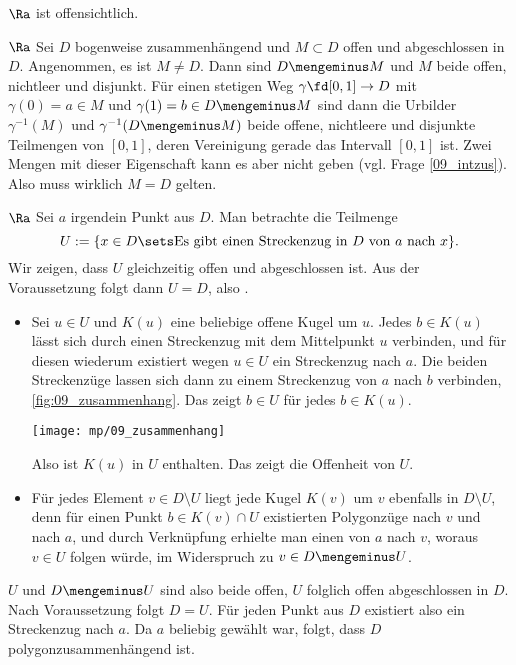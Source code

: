 \begin{antwort}
   $\Ra$  ist offensichtlich.

  \medskip\noindent
   $\Ra$  Sei $D$ bogenweise zusammenhängend 
  und $M\subset D$ offen und abgeschlossen in $D$. 
  Angenommen, es ist $M\not=D$. Dann sind $D\mengeminus M$ und $M$ beide 
  offen, nichtleer und disjunkt. Für einen stetigen Weg 
  $\gamma\fd [0,1] \to D$ mit $\gamma(0)=a \in M$ und 
  $\gamma(1)=b \in  D\mengeminus M$ sind dann die 
  Urbilder $\gamma^{-1}(M)$ und $\gamma^{-1}(D\mengeminus M)$ beide 
  offene, nichtleere und disjunkte Teilmengen von $[0,1]$, deren 
  Vereinigung gerade das Intervall $[0,1]$ ist. 
  Zwei Mengen mit dieser Eigenschaft kann es aber nicht geben 
  (vgl. Frage \ref{09_intzus}). 
  Also muss wirklich $M=D$ gelten. 


  \medskip\noindent
   $\Ra$  Sei $a$ irgendein Punkt aus $D$. 
  Man betrachte die Teilmenge 
  \[
  U := 
  \{ x \in D\sets \text{Es gibt einen Streckenzug in $D$ von $a$ nach $x$} \}.
  \]
  Wir zeigen, dass $U$ gleichzeitig offen und abgeschlossen ist. 
  Aus der Voraussetzung folgt dann $U=D$, also .
  {\setlength{\labelsep}{4mm}
    \begin{itemize}
    \item[\desc{i}] Sei $u\in U$ und $K(u)$ eine beliebige offene Kugel um $u$. 
      Jedes $b\in K(u)$ lässt sich durch einen Streckenzug mit dem 
      Mittelpunkt $u$ verbinden, und für diesen wiederum existiert 
      wegen $u\in U$ ein Streckenzug nach $a$. Die beiden Streckenzüge 
      lassen sich dann zu einem Streckenzug von $a$ nach $b$ verbinden, \sieheAbbildung\ref{fig:09_zusammenhang}. 
      Das zeigt $b\in U$ für jedes $b\in K(u)$. 

      \begin{center}
        \texttt{[image: mp/09\_zusammenhang]}
        \label{fig:09_zusammenhang}
      \end{center}

      Also ist $K(u)$ in $U$ enthalten. Das zeigt die Offenheit von $U$. \\[-2mm]
    \item[\desc{ii}] 
      Für jedes Element $v\in D\setminus U$ liegt jede 
      Kugel $K(v)$ um $v$ ebenfalls in $D\setminus U$, denn für einen 
      Punkt $b \in K(v)\cap U$ existierten Polygonzüge nach $v$ und nach $a$, 
      und durch Verknüpfung erhielte man einen von $a$ nach $v$, woraus $v\in U$ 
      folgen würde, im Widerspruch zu $v\in D\mengeminus U$.
    \end{itemize}}
  \noindent
  $U$ und $D\mengeminus U$ sind also beide offen, $U$ folglich  
  offen  abgeschlossen in $D$. 
  Nach Voraussetzung folgt $D=U$. Für jeden 
  Punkt aus $D$ existiert also ein Streckenzug nach $a$. Da $a$ beliebig 
  gewählt war, folgt, dass $D$ polygonzusammenhängend ist.
  \AntEnd
\end{antwort}


